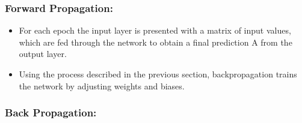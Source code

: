 \documentclass[./project-report/src/latex/project-report.tex]{subfiles}
\begin{document}
\subsubsection{Forward Propagation:}

\begin{itemize}
    \item For each epoch the input layer is presented with a matrix of input values, which are fed through the network to obtain a final prediction A from the output layer.
	\item Using the process described in the previous section, backpropagation trains the network by adjusting weights and biases.
\end{itemize}

\subsubsection{Back Propagation:}
\end{document}
